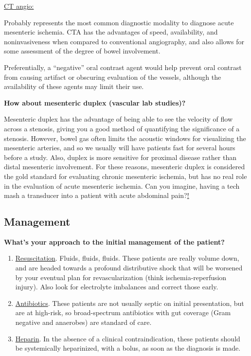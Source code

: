 \documentclass[
]{book}
\begin{document}
\underline{CT angio:}

Probably represents the most common diagnostic modality to diagnose
acute mesenteric ischemia. CTA has the advantages of speed,
availability, and noninvasiveness when compared to conventional
angiography, and also allows for some assessment of the degree of bowel
involvement.~

Preferentially, a ``negative'' oral contrast agent would help prevent oral
contrast from causing artifact or obscuring evaluation of the vessels,
although the availability of these agents may limit their use.

\textbf{How about mesenteric duplex (vascular lab studies)?}

Mesenteric duplex has the advantage of being able to see the velocity of
flow across a stenosis, giving you a good method of quantifying the
significance of a stenosis. However, bowel gas often limits the acoustic
windows for visualizing the mesenteric arteries, and so we usually will
have patients fast for several hours before a study. Also, duplex is
more sensitive for proximal disease rather than distal mesenteric
involvement. For these reasons, mesenteric duplex is considered the gold
standard for evaluating chronic mesenteric ischemia, but has no real
role in the evaluation of acute mesenteric ischemia. Can you imagine,
having a tech mash a transducer into a patient with acute abdominal
pain?\underline{!}~

\hypertarget{management-4}{%
\subsection{Management}\label{management-4}}

\textbf{What's your approach to the initial management of the patient?}

\begin{enumerate}
\def\labelenumi{\arabic{enumi}.}
\item
  \underline{Resuscitation}. Fluids, fluids, fluids. These patients are
  really volume down, and are headed towards a profound distributive
  shock that will be worsened by your eventual plan for
  revascularization (think ischemia-reperfusion injury). Also look for
  electrolyte imbalances and correct those early.
\item
  \underline{Antibiotics}. These patients are not usually septic on initial
  presentation, but are at high-risk, so broad-spectrum antibiotics
  with gut coverage (Gram negative and anaerobes) are standard of
  care.
\item
  \underline{Heparin}. In the absence of a clinical contraindication, these
  patients should be systemically heparinized, with a bolus, as soon
  as the diagnosis is made.~
\end{enumerate}
\end{document}
